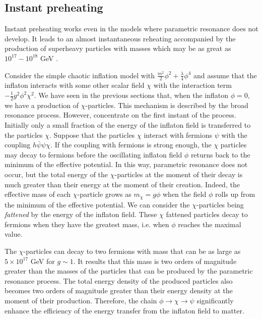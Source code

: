 \documentclass[11pt,a4paper,twoside]{book}
\begin{document}
\subsection{Instant preheating}
Instant preheating works even in the models where parametric resonance does not develop. It leads to an almost instantaneous reheating accompanied by the production of superheavy particles with masses which may be as great as $ 10^{17}-10^{18} $ GeV \cite{Chap4:InstantPreheating}.

Consider the simple chaotic inflation model with $ \frac{m^{2}}{2}\phi^{2}+ \frac{\lambda}{4}\phi^{4} $ and assume that the inflaton interacts with some other scalar field $\chi$ with the interaction term $ -\frac{1}{2}g^{2}\phi^{2}\chi^{2} $. We have seen in the previous sections that, when the inflaton $\phi=0$, we have a production of $\chi$-particles. This mechanism is described by the broad resonance process. However, concentrate on the first instant of the process. Initially only a small fraction of the energy of the inflaton field is transferred to the particles $\chi$. Suppose that the particles $\chi$ interact with fermions $\psi$ with the coupling $ h\bar{\psi}\psi\chi $. If the coupling with fermions is strong enough, the $\chi$ particles may decay to fermions before the oscillating inflaton field $\phi$ returns back to the minimum of the effective potential. In this way, parametric resonance does not occur, but the total energy of the $\chi$-particles at the moment of their decay is much greater than their energy at the moment of their creation. Indeed, the effective mass of each $\chi$-particle grows as $ m_{\chi}=g\phi $ when the field $\phi$ rolls up from the minimum of the effective potential. We can consider the $\chi$-particles being \textit{fattened} by the energy of the inflaton field. These $\chi$ fattened particles decay to fermions when they have the greatest mass, i.e. when $\phi$ reaches the maximal value.

The $\chi$-particles can decay to two fermions with mass that can be as large as $ 5 \times 10^{17}$ GeV  for $ g \sim 1 $. It results that this mass is two orders of magnitude greater than the masses of the particles that can be produced by the parametric resonance process. The total energy density of the produced particles also becomes two orders of magnitude greater than their energy density at the moment of their production. Therefore, the chain $ \phi \rightarrow \chi \rightarrow \psi  $ significantly enhance the efficiency of the energy transfer from the inflaton field to matter.
\end{document}
